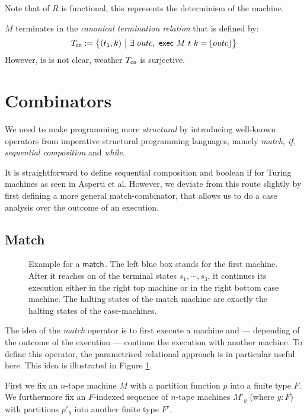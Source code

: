 \documentclass{psartcl}
\begin{document}
Note that of $R$ is functional, this represents the determinism of the machine.

\begin{lemma}
  \label{lem:canonical-term-relation}
  $M$ terminates in the \emph{canonical termination relation} that is defined by:
  $$T_{\textsf{cn}} := \bigl\{ (t_1, k)~\big|~ \exists~outc,~ \textsf{exec}~M~t~k = \left\lfloor {outc}\right\rfloor  \bigr \}$$
  However, is is not clear, weather $T_{\textsf{cn}}$ is surjective.
\end{lemma}

\section{Combinators}
\label{sec:combinators}

We need to make programming more \textit{structural} by introducing well-known operators from imperative structural programming languages, namely
\emph{match}, \emph{if}, \emph{sequential composition} and \emph{while}.

It is straightforward to define sequential composition and boolean if for Turing machines as seen in Asperti et al.
However, we deviate from this route slightly by first defining a more general match-combinator, that allows us to do a case analysis over the outcome
of an execution.

\subsection{Match}

\begin{figure}
  \center
  
  \caption{Example for a $\textsf{match}$.  The left blue box stands for the first machine.  After it reaches on of the terminal states
    $s_1, \cdots, s_3$, it continues its execution either in the right top machine or in the right bottom case machine.
  The halting states of the match machine are exactly the halting states of the case-machines.}
  \label{fig:match-example}
\end{figure}

The idea of the \emph{match} operator is to first execute a machine and --- depending of the outcome of the execution --- continue the execution with
another machine.  To define this operator, the parametrised relational approach is in particular useful here.  This idea is illustrated in Figure
\ref{fig:match-example}.

First we fix an $n$-tape machine $M$ with a partition function $p$ into a finite type $F$.
We furthermore fix an $F$-indexed sequence of $n$-tape machines $M'_y$ (where $y:F$) with partitions $p'_y$ into another finite type $F'$.
\end{document}
